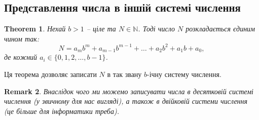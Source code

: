 \documentclass[a4paper, 10pt]{article}
\theoremstyle{theoremdd}
\newtheorem{theorem}{Theorem}[subsection]
\theoremstyle{theoremdd}
\theoremstyle{theoremdd}
\theoremstyle{theoremdd}
\theoremstyle{theoremdd}
\theoremstyle{theoremdd}
\newtheorem{remark}[theorem]{Remark}
\theoremstyle{theoremdd}
\theoremstyle{theoremdd}
\begin{document}
\subsection{Представлення числа в іншій системі числення}
\begin{theorem}
Нехай $b > 1$ -- ціле та $N \in \mathbb{N}$. Тоді число $N$ розкладається єдиним чином так:
\begin{equation}
\label{integer_representation}
N = a_m b^m + a_{m-1} b^{m-1} + \dots + a_2 b^2 + a_1 b + a_0,
\end{equation}
де кожний $a_i \in \{0,1,2,\dots,b-1\}$.
\end{theorem}

Ця теорема дозволяє записати $N$ в так звану $b$-ічну систему числення.

\begin{remark}
Внаслідок чого ми можемо записувати числа в десятковій системі числення (\textit{у звичному для нас вигляді}), а також в двійковій системи числення (\textit{це більше для інформатики треба}).
\end{remark}
\end{document}
